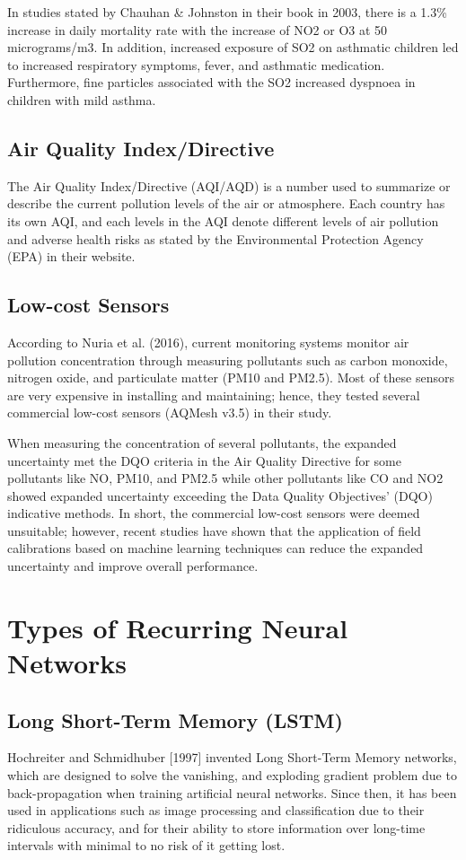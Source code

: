 ﻿\documentclass[10pt,11pt,12pt,oneside]{book}
\begin{document}
        In studies stated by Chauhan \& Johnston in their book in 2003, there is a 1.3\% increase in daily mortality rate with the increase of NO2 or O3 at 50 micrograms/m3. In addition, increased exposure of SO2 on asthmatic children led to increased respiratory symptoms, fever, and asthmatic medication. Furthermore, fine particles associated with the SO2 increased dyspnoea in children with mild asthma. \cite{doi:10.1093/bmb/ldg022}
        \subsection{Air Quality Index/Directive}
        The Air Quality Index/Directive (AQI/AQD) is a number used to summarize or describe the current pollution levels of the air or atmosphere. Each country has its own AQI, and each levels in the AQI denote different levels of air pollution and adverse health risks as stated by the Environmental Protection Agency (EPA) in their website. \cite{airbasics}
        \subsection{Low-cost Sensors}
        According to Nuria et al.
 (2016), current monitoring systems monitor air pollution concentration through measuring pollutants such as carbon monoxide, nitrogen oxide, and particulate matter (PM10 and PM2.5). Most of these sensors are very expensive in installing and maintaining; hence, they tested several commercial low-cost sensors (AQMesh v3.5) in their study.

        When measuring the concentration of several pollutants, the expanded uncertainty met the DQO criteria in the Air Quality Directive for some pollutants like NO, PM10, and PM2.5 while other pollutants like CO and NO2 showed expanded uncertainty exceeding the Data Quality Objectives’ (DQO) indicative methods. In short, the commercial low-cost sensors were deemed unsuitable; however, recent studies have shown that the application of field calibrations based on machine learning techniques can reduce the expanded uncertainty and improve overall performance. \cite{Castell2017}
    \section{Types of Recurring Neural Networks}
        \subsection{Long Short-Term Memory (LSTM)}
        Hochreiter and Schmidhuber [1997] invented Long Short-Term Memory networks, which are designed to solve the vanishing, and exploding gradient problem due to back-propagation when training artificial neural networks. Since then, it has been used in applications such as image processing and classification due to their ridiculous accuracy, and for their ability to store information over long-time intervals with minimal to no risk of it getting lost. \cite{Hochreiter:1997:LSM:1246443.1246450}
\end{document}
